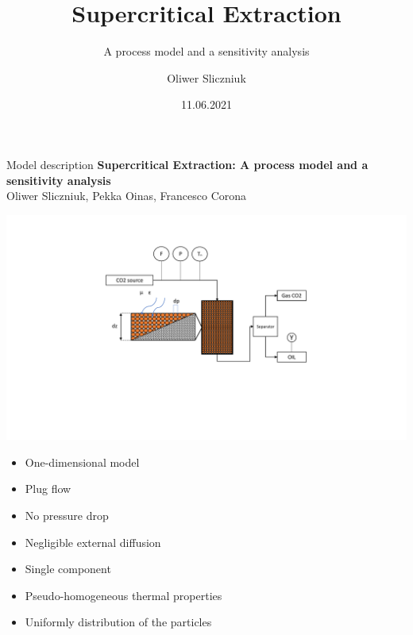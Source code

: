 \documentclass[8pt]{beamer}
\title{Supercritical Extraction}
\subtitle{A process model and a sensitivity analysis}
\date{11.06.2021}
\author{Oliwer Sliczniuk}
\institute{Aalto University}
\begin{document}
	
	\begin{frame}[fragile]{Model description}
		\large{\textbf{Supercritical Extraction: A process model and a sensitivity analysis}}\\
		\small{Oliwer Sliczniuk, Pekka Oinas, Francesco Corona} 
		\vfill
		\begin{minipage}{0.75\linewidth}
		\includegraphics[trim = 6cm 5cm 6cm 2cm,clip,width=\linewidth]{Figures/SFE.pdf}
		\end{minipage}
		\begin{minipage}{0.24\linewidth}
			\begin{itemize}
				\item One-dimensional model
				\item Plug flow 
				\item No pressure drop
				\item Negligible external diffusion 
				\item Single component
				\item Pseudo-homogeneous thermal properties
				\item Uniformly distribution of the particles
			\end{itemize}
		\end{minipage}
	\\	
	\end{frame}
\end{document}
